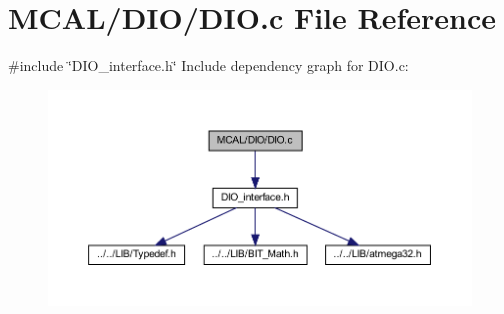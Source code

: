 \section{M\+C\+A\+L/\+D\+I\+O/\+D\+IO.c File Reference}
\label{_d_i_o_8c}
{\ttfamily \#include \char`\"{}D\+I\+O\+\_\+interface.\+h\char`\"{}}\newline
Include dependency graph for D\+I\+O.\+c\+:\nopagebreak
\begin{figure}[H]
\begin{center}
\leavevmode
\includegraphics[width=350pt]{_d_i_o_8c__incl}
\end{center}
\end{figure}
